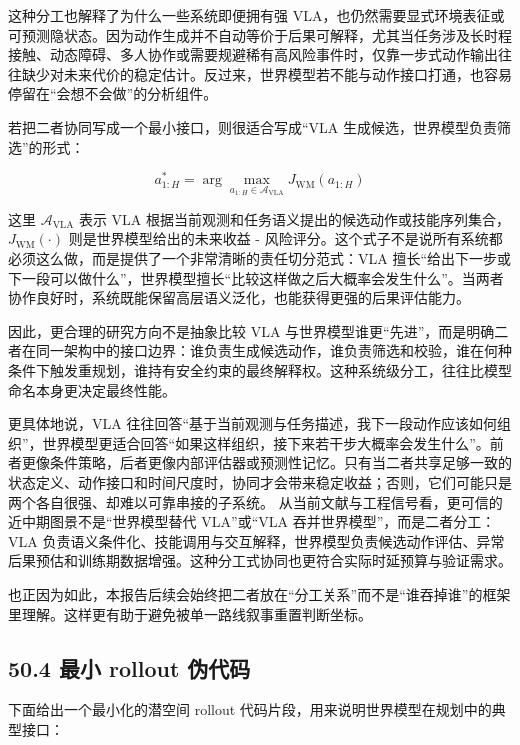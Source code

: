 这种分工也解释了为什么一些系统即便拥有强 VLA，也仍然需要显式环境表征或可预测隐状态。因为动作生成并不自动等价于后果可解释，尤其当任务涉及长时程接触、动态障碍、多人协作或需要规避稀有高风险事件时，仅靠一步式动作输出往往缺少对未来代价的稳定估计。反过来，世界模型若不能与动作接口打通，也容易停留在“会想不会做”的分析组件。

若把二者协同写成一个最小接口，则很适合写成“VLA 生成候选，世界模型负责筛选”的形式：

\begingroup
\footnotesize
\begin{equation*}
a_{1:H}^{*} =
\arg\max_{a_{1:H} \in \mathcal{A}_{\mathrm{VLA}}}
J_{\mathrm{WM}}(a_{1:H})
\end{equation*}
\endgroup

这里 \(\mathcal{A}_{\mathrm{VLA}}\) 表示 VLA 根据当前观测和任务语义提出的候选动作或技能序列集合，\(J_{\mathrm{WM}}(\cdot)\) 则是世界模型给出的未来收益 - 风险评分。这个式子不是说所有系统都必须这么做，而是提供了一个非常清晰的责任切分范式：VLA 擅长“给出下一步或下一段可以做什么”，世界模型擅长“比较这样做之后大概率会发生什么”。当两者协作良好时，系统既能保留高层语义泛化，也能获得更强的后果评估能力。

因此，更合理的研究方向不是抽象比较 VLA 与世界模型谁更“先进”，而是明确二者在同一架构中的接口边界：谁负责生成候选动作，谁负责筛选和校验，谁在何种条件下触发重规划，谁持有安全约束的最终解释权。这种系统级分工，往往比模型命名本身更决定最终性能。

更具体地说，VLA 往往回答“基于当前观测与任务描述，我下一段动作应该如何组织”，世界模型更适合回答“如果这样组织，接下来若干步大概率会发生什么”。前者更像条件策略，后者更像内部评估器或预测性记忆。只有当二者共享足够一致的状态定义、动作接口和时间尺度时，协同才会带来稳定收益；否则，它们可能只是两个各自很强、却难以可靠串接的子系统。 从当前文献与工程信号看，更可信的近中期图景不是“世界模型替代 VLA”或“VLA 吞并世界模型”，而是二者分工：VLA 负责语义条件化、技能调用与交互解释，世界模型负责候选动作评估、异常后果预估和训练期数据增强。这种分工式协同也更符合实际时延预算与验证需求。

也正因为如此，本报告后续会始终把二者放在“分工关系”而不是“谁吞掉谁”的框架里理解。这样更有助于避免被单一路线叙事重置判断坐标。

\subsection*{50.4 最小 rollout 伪代码}


下面给出一个最小化的潜空间 rollout 代码片段，用来说明世界模型在规划中的典型接口：

